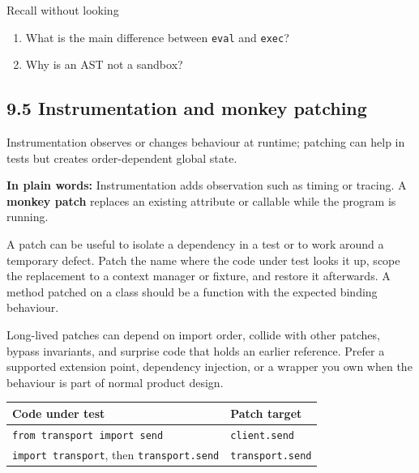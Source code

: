 \documentclass[11pt]{article}
\begin{document}
\begin{keepsection}
\begin{recallbox}{Recall without looking}
\begin{enumerate}
\item What is the main difference between \texttt{eval} and \texttt{exec}?
\item Why is an AST not a sandbox?
\end{enumerate}

\end{recallbox}
\end{keepsection}

\begin{keepsection}
\section{9.5 Instrumentation and monkey patching}

Instrumentation observes or changes behaviour at runtime; patching can help in tests but creates order-dependent global state.

\begin{plainbox}\textbf{In plain words:} Instrumentation adds observation such as timing or tracing. A \textbf{monkey patch} replaces an existing attribute or callable while the program is running.\end{plainbox}

A patch can be useful to isolate a dependency in a test or to work around a temporary defect. Patch the name where the code under test looks it up, scope the replacement to a context manager or fixture, and restore it afterwards. A method patched on a class should be a function with the expected binding behaviour.

Long-lived patches can depend on import order, collide with other patches, bypass invariants, and surprise code that holds an earlier reference. Prefer a supported extension point, dependency injection, or a wrapper you own when the behaviour is part of normal product design.

\begin{center}\small\begin{tabularx}{\linewidth}{>{\raggedright\arraybackslash}X>{\raggedright\arraybackslash}X}\toprule
\textbf{Code under test} & \textbf{Patch target} \\ \midrule
\texttt{from transport import send} & \texttt{client.send} \\
\texttt{import transport}, then \texttt{transport.send} & \texttt{transport.send} \\
\bottomrule\end{tabularx}\end{center}


\end{keepsection}
\end{document}
